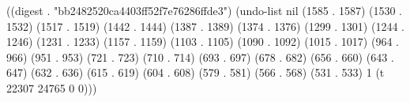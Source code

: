 
((digest . "bb2482520ca4403ff52f7e76286ffde3") (undo-list nil (1585 . 1587) (1530 . 1532) (1517 . 1519) (1442 . 1444) (1387 . 1389) (1374 . 1376) (1299 . 1301) (1244 . 1246) (1231 . 1233) (1157 . 1159) (1103 . 1105) (1090 . 1092) (1015 . 1017) (964 . 966) (951 . 953) (721 . 723) (710 . 714) (693 . 697) (678 . 682) (656 . 660) (643 . 647) (632 . 636) (615 . 619) (604 . 608) (579 . 581) (566 . 568) (531 . 533) 1 (t 22307 24765 0 0)))
